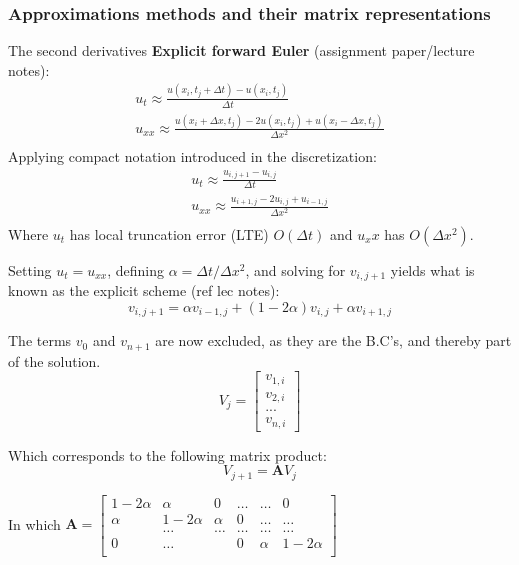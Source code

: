 \documentclass[%
oneside,                 %
final,                   %
10pt]{article}
\begin{document}
\subsubsection{Approximations methods and their matrix representations}
The second derivatives
\textbf{Explicit forward Euler} (assignment paper/lecture notes):
\begin{align}
u_t \approx \frac{u(x_i,t_j+\Delta t) -u(x_i,t_j)}{\Delta t} \\
u_{xx} \approx \frac{u(x_i+\Delta x,t_j) -2u(x_i,t_j)+u(x_i-\Delta x,t_j)}{\Delta x^2}\\
\end{align}
Applying compact notation introduced in the discretization:
\begin{align}
u_t \approx \frac{u_{i,j+1} -u_{i,j}}{\Delta t} \\
u_{xx} \approx \frac{u_{i+1,j} -2u_{i,j}+u_{i-1,j}}{\Delta x^2}\\
\end{align}
Where $u_t$ has local truncation error (LTE) $O(\Delta t)$ and  $u_xx$ has $O(\Delta x^2)$. \newline

Setting $u_t=u_{xx}$, defining $\alpha = \Delta t/\Delta x^2$, and solving for $v_{i,j+1}$ yields what is known as the explicit scheme (ref lec notes): 
\begin{equation}
v_{i,j+1}=\alpha v_{i-1,j}+(1-2 \alpha)v_{i,j}+\alpha v_{i+1,j}
\end{equation}



The terms $v_0$ and $v_{n+1}$ are now excluded, as they are the B.C's, and thereby part of the solution. 
\begin{equation} V_j=
\begin{bmatrix}
v_{1,i} \\ v_{2,i} \\ ...\\ v_{n,i}
\end{bmatrix}
\end{equation}


Which corresponds to the following matrix product:
\begin{equation}
V_{j+1}=\mathbf{A}V_j
\end{equation}

In which $\textbf{A}=  \begin{bmatrix}
                           1-2\alpha & \alpha & 0 &\dots   & \dots &0 \\
                           \alpha & 1-2\alpha  &  \alpha &0 &\dots &\dots \\
                           & \dots   & \dots &\dots   &\dots & \dots \\
                      
                           0&\dots    &  & 0  &\alpha & 1-2\alpha \\
              			\end{bmatrix}$ \newline
              			
\end{document}
